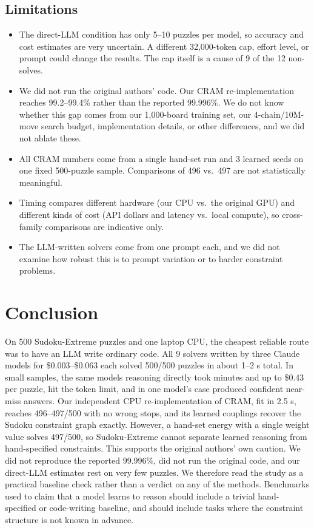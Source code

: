 \documentclass{article} %
\begin{document}
\subsection{Limitations}
\begin{itemize}
\item The direct-LLM condition has only 5--10 puzzles per model, so accuracy and cost estimates are very uncertain. A different 32,000-token cap, effort level, or prompt could change the results. The cap itself is a cause of 9 of the 12 non-solves.
\item We did not run the original authors' code. Our CRAM re-implementation reaches 99.2--99.4\% rather than the reported 99.996\%. We do not know whether this gap comes from our 1,000-board training set, our 4-chain/10M-move search budget, implementation details, or other differences, and we did not ablate these.
\item All CRAM numbers come from a single hand-set run and 3 learned seeds on one fixed 500-puzzle sample. Comparisons of 496 vs.\ 497 are not statistically meaningful.
\item Timing compares different hardware (our CPU vs.\ the original GPU) and different kinds of cost (API dollars and latency vs.\ local compute), so cross-family comparisons are indicative only.
\item The LLM-written solvers come from one prompt each, and we did not examine how robust this is to prompt variation or to harder constraint problems.
\end{itemize}

\section{Conclusion}
\label{sec:conclusion}
On 500 Sudoku-Extreme puzzles and one laptop CPU, the cheapest reliable route was to have an LLM write ordinary code. All 9 solvers written by three Claude models for \$0.003--\$0.063 each solved 500/500 puzzles in about 1--2 s total. In small samples, the same models reasoning directly took minutes and up to \$0.43 per puzzle, hit the token limit, and in one model's case produced confident near-miss answers. Our independent CPU re-implementation of CRAM, fit in 2.5 s, reaches 496--497/500 with no wrong stops, and its learned couplings recover the Sudoku constraint graph exactly. However, a hand-set energy with a single weight value solves 497/500, so Sudoku-Extreme cannot separate learned reasoning from hand-specified constraints. This supports the original authors' own caution. We did not reproduce the reported 99.996\%, did not run the original code, and our direct-LLM estimates rest on very few puzzles. We therefore read the study as a practical baseline check rather than a verdict on any of the methods. Benchmarks used to claim that a model learns to reason should include a trivial hand-specified or code-writing baseline, and should include tasks where the constraint structure is not known in advance.



\end{document}
